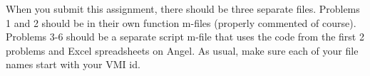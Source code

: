 When you submit this assignment, there should be three separate files.  Problems 1 and 2 should be in their own function m-files (properly commented of course).  Problems 3-6 should be a separate script m-file that uses the code from the first 2 problems and Excel spreadsheets on Angel.  As usual, make sure each of your file names start with your VMI id.

